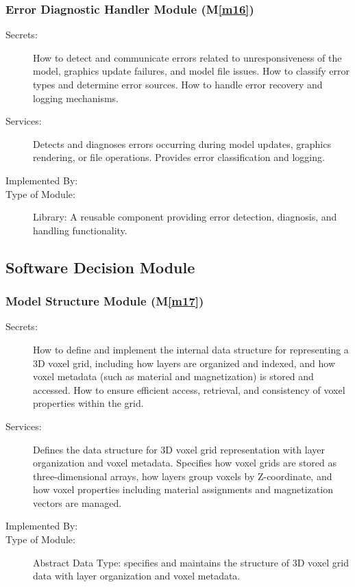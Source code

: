 \documentclass[12pt, titlepage]{article}
\newcommand{\mref}[1]{M\ref{#1}}
\begin{document}
\fi

\subsubsection{Error Diagnostic Handler Module (\mref{m16})}

\begin{description}
\item[Secrets:] How to detect and communicate errors related to unresponsiveness of the model, graphics update failures, and model file issues. How to classify error types and determine error sources. How to handle error recovery and logging mechanisms.
\item[Services:] Detects and diagnoses errors occurring during model updates, graphics rendering, or file operations. Provides error classification and logging.
\item[Implemented By:] \progname{}
\item[Type of Module:] Library: A reusable component providing error detection, diagnosis, and handling functionality.
\end{description}



\subsection{Software Decision Module}

\subsubsection{Model Structure Module (\mref{m17})}

\begin{description}
  \item[Secrets:] How to define and implement the internal data structure for representing a 3D voxel grid, including how layers are organized and indexed, and how voxel metadata (such as material and magnetization) is stored and accessed. How to ensure efficient access, retrieval, and consistency of voxel properties within the grid.
  \item[Services:] Defines the data structure for 3D voxel grid representation with layer organization and voxel metadata. Specifies how voxel grids are stored as three-dimensional arrays, how layers group voxels by Z-coordinate, and how voxel properties including material assignments and magnetization vectors are managed. 
  \item[Implemented By:] \progname{}
  \item[Type of Module:] Abstract Data Type: specifies and maintains the structure of 3D voxel grid data with layer organization and voxel metadata.
\end{description}
\end{document}
